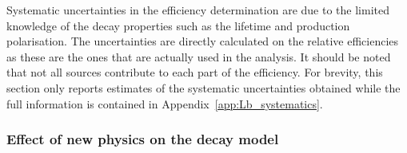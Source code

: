 %
Systematic uncertainties in the efficiency determination are due to the limited knowledge
of the decay properties such as the \Lb lifetime and production polarisation.
The uncertainties are directly calculated on the relative efficiencies as these are the ones that
are actually used in the analysis. It should be noted that not all sources contribute to each part
of the efficiency. For brevity, this section only reports estimates of the systematic
uncertainties obtained while the full information is contained in Appendix~\ref{app:Lb_systematics}.
%

\subsubsection{Effect of new physics on the decay model}
\label{sec:WCvariation}


